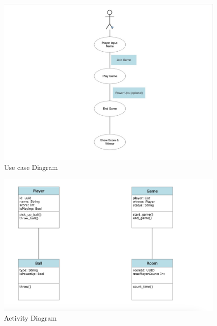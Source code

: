 \documentclass[12pt]{report}
\begin{document}
\vspace{1.5cm}
\begin{figure}[h]
\centering
\includegraphics[scale=0.7]{images15.png}
\caption{Use case Diagram}
\label{ Use case Diagram}
\end{figure}



\vspace{1.5cm}
\begin{figure}[h]
\centering
\includegraphics[scale=0.8]{images14.png}
\caption{Activity Diagram}
\label{Activity Diagram}
\end{figure}


\justifying
\setlength{\parindent}{4em}
\setlength{\parskip}{0.5em}
\renewcommand{\baselinestretch}{1.5}
\normalsize
\end{document}
